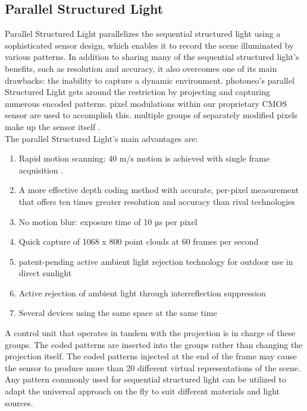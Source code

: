 \documentclass[12pt]{article}
\begin{document}
\subsection{Parallel Structured Light}

Parallel Structured Light parallelizes the sequential structured light using a sophisticated sensor design, which enables it to record the scene illuminated by various patterns. In addition to sharing many of the sequential structured light's benefits, such as resolution and accuracy, it also overcomes one of its main drawbacks: the inability to capture a dynamic environment. photoneo's parallel Structured Light gets around the restriction by projecting and capturing numerous encoded patterns. pixel modulations within our proprietary CMOS sensor are used to accomplish this. multiple groups of separately modified pixels make up the sensor itself \cite{ref15}.  \\


The parallel Structured Light's main advantages are:
\begin{enumerate}
 \item  Rapid motion scanning: 40 m/s motion is achieved with single frame acquisition \cite{ref15}.
\item A more effective depth coding method with accurate, per-pixel measurement that offers ten times greater resolution and accuracy than rival technologies\cite{ref15}
 \item No motion blur: exposure time of 10 µs per pixel\cite{ref15}
 \item Quick capture of 1068 x 800 point clouds at 60 frames per second\cite{ref15}
\item patent-pending active ambient light rejection technology for outdoor use in direct sunlight\cite{ref15}
 \item Active rejection of ambient light through interreflection suppression\cite{ref15}
\item Several devices using the same space at the same time\cite{ref15}\\
\end{enumerate}

A control unit that operates in tandem with the projection is in charge of these groups. The coded patterns are inserted into the groups rather than changing the projection itself. The coded patterns injected at the end of the frame may cause the sensor to produce more than 20 different virtual representations of the scene.  Any pattern commonly used for sequential structured light can be utilized to adapt the universal approach on the fly to suit different materials and light sources\cite{ref15}. \\
\end{document}

